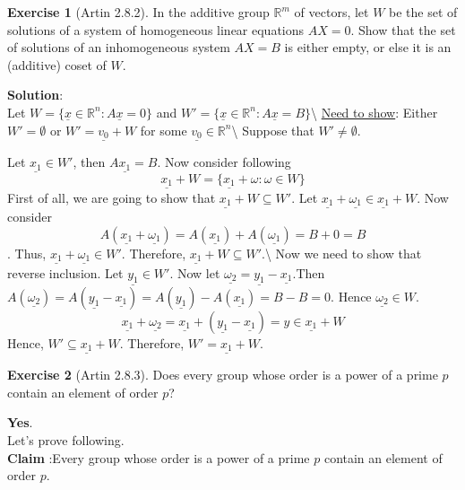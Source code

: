 \documentclass[
]{book}
\theoremstyle{definition}
\theoremstyle{definition}
\theoremstyle{definition}
\newtheorem{exercise}{Exercise}[chapter]
\theoremstyle{definition}
\theoremstyle{remark}
\begin{document}
\begin{exercise}[Artin 2.8.2]
\protect\hypertarget{exr:unnamed-chunk-180}{}\label{exr:unnamed-chunk-180}In the additive group \(\mathbb{R}^m\) of vectors, let \(W\) be the set of solutions of a system of homogeneous linear equations \(AX = 0\). Show that the set of solutions of an inhomogeneous system \(AX = B\) is either empty, or else it is an (additive) coset of \(W\).
\end{exercise}

\textbf{Solution}:\\
Let \(W=\{\underline{x}\in\mathbb{R}^n:A\underline{x}=0\}\)
and \(W'=\{\underline{x}\in\mathbb{R}^n:A\underline{x}=B\}\)\textbackslash{}
\underline{Need to show}: Either \(W'=\emptyset\) or \(W'=\underline{v_0} +W\) for some \(\underline{v_0}\in \mathbb{R}^n\)\textbackslash{}
Suppose that \(W'\neq \emptyset\).

Let \(\underline{x_1}\in W'\), then \(A\underline{x_1}=B\).
Now consider following \[\underline{x_1}+W=\{\underline{x_1}+\omega:\omega\in W\}\]
First of all, we are going to show that \(\underline{x_1}+W \subseteq W'\).
Let \(\underline{x_1}+\underline{\omega_1}\in \underline{x_1}+W\). Now consider
\[A(\underline{x_1}+\underline{\omega_1})=A(\underline{x_1})+A(\underline{\omega_1})=B+0=B\].
Thus, \(\underline{x_1}+\underline{\omega_1}\in W'\). Therefore, \(\underline{x_1}+W\subseteq W'\).\textbackslash{}
Now we need to show that reverse inclusion.
Let \(\underline{y_1}\in W'\). Now let \(\underline{\omega_2}=\underline{y_1}-\underline{x_1}\).Then
\(A(\underline{\omega_2})=A(\underline{y_1}-\underline{x_1})=A(\underline{y_1})-A(\underline{x_1})=B-B=0\). Hence \(\underline{\omega_2}\in W\).
\[ \underline{x_1}+\underline{\omega_2}=\underline{x_1}+(\underline{y_1}-\underline{x_1}) =y \in  \underline{x_1}+W \]
Hence, \(W'\subseteq \underline{x_1}+W\). Therefore, \(W'=\underline{x_1}+W\).

\begin{exercise}[Artin 2.8.3]
\protect\hypertarget{exr:unnamed-chunk-181}{}\label{exr:unnamed-chunk-181}Does every group whose order is a power of a prime \(p\) contain an element of order \(p\)?
\end{exercise}

\textbf{Yes}.\\
Let's prove following.\\
\textbf{Claim} :Every group whose order is a power of a prime \(p\) contain an element of order \(p\).
\end{document}
